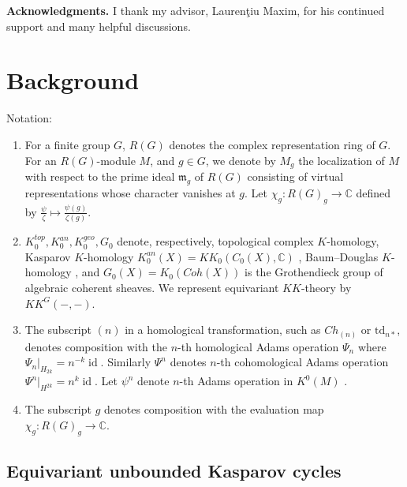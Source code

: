 \documentclass[11pt,leqno,twoside]{amsart}
\theoremstyle{plainsl}
\theoremstyle{definition}
\newcommand{\td}{\mathrm{td}}
\begin{document}
\medskip
{\bf Acknowledgments.}  I thank my advisor, Lauren\c{t}iu Maxim, for his continued support and many helpful discussions.


\section{Background}\label{backgroundnotations}
Notation:


\begin{enumerate}
    \item For a finite group $G$, $R(G)$ denotes the complex representation ring of $G$. For an $R(G)$-module $M$, and $g\in G$, we denote by $M_g$ the localization of $M$ with respect to the prime ideal $\mathfrak{m}_g$ of $R(G)$ consisting of virtual representations whose character vanishes at $g$. Let
$\chi_g: R(G)_g \rightarrow \mathbb{C}$ defined by $\frac{\psi}{\zeta}\mapsto\frac{\psi(g)}{\zeta(g)}$.











\item $K^{top}_{0}, K^{an}_{0}, K_0^{geo}, G_0$  denote, respectively,  topological complex $K$-homology,  Kasparov $K$-homology $K^{an}_{0}(X)=KK_{0}(C_0(X),\mathbb{C})$ \cite{K},  Baum--Douglas $K$-homology \cite{BD}, and  $G_0(X)=K_0(Coh(X))$ is the Grothendieck group of algebraic coherent sheaves. We represent equivariant $KK$-theory by $KK^G(-,-)$.
\item The subscript $(n)$ in a homological transformation, such as $Ch_{(n)}$ or $\td_{n*}$, denotes composition with the $n$-th homological Adams operation $\Psi_n$ where  $\Psi_n|_{H_{2k}}=n^{-k}\operatorname{id}$. Similarly $\Psi^n$ denotes $n$-th cohomological Adams operation $\Psi^n|_{H^{2k}}=n^k\operatorname{id}$. Let $\psi^n$ denote $n$-th Adams operation in $K^0(M)$ \cite{At}.
\item The subscript $g$ denotes composition with the evaluation map $\chi_g:R(G)_g\rightarrow\mathbb{C}$. 




\end{enumerate}


\subsection{Equivariant unbounded Kasparov cycles}
\end{document}
